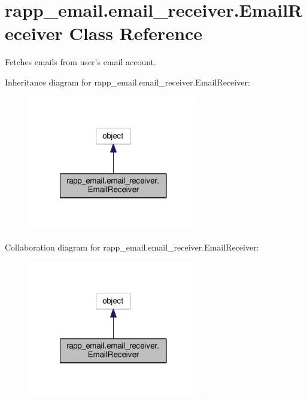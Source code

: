 \hypertarget{classrapp__email_1_1email__receiver_1_1EmailReceiver}{\section{rapp\-\_\-email.\-email\-\_\-receiver.\-Email\-Receiver Class Reference}
\label{classrapp__email_1_1email__receiver_1_1EmailReceiver}
}


Fetches emails from user's email account.  




Inheritance diagram for rapp\-\_\-email.\-email\-\_\-receiver.\-Email\-Receiver\-:
\nopagebreak
\begin{figure}[H]
\begin{center}
\leavevmode
\includegraphics[width=212pt]{classrapp__email_1_1email__receiver_1_1EmailReceiver__inherit__graph}
\end{center}
\end{figure}


Collaboration diagram for rapp\-\_\-email.\-email\-\_\-receiver.\-Email\-Receiver\-:
\nopagebreak
\begin{figure}[H]
\begin{center}
\leavevmode
\includegraphics[width=212pt]{classrapp__email_1_1email__receiver_1_1EmailReceiver__coll__graph}
\end{center}
\end{figure}
